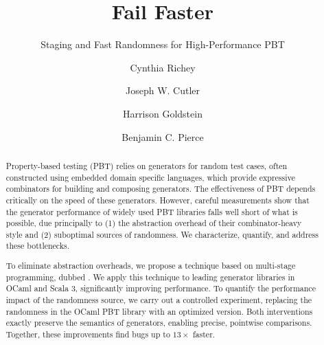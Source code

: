 \documentclass[acmsmall]{acmart}
\theoremstyle{definition}
\begin{document}
\title{Fail Faster}
\subtitle{Staging and Fast Randomness for High-Performance PBT}



\author{Cynthia Richey}

\author{Joseph W. Cutler}
\authornotemark[1]

\author{Harrison Goldstein}

\author{Benjamin C. Pierce}
\renewcommand{\shortauthors}{C. Richey, J. W. Cutler, H. Goldstein, and B. C. Pierce}

\begin{abstract}
Property-based testing (PBT) relies on generators for random test
cases, often constructed using embedded domain specific languages,
which provide expressive combinators for building and composing
generators.  The effectiveness of PBT depends critically on the speed
of these generators.
%
However, careful measurements show that the generator performance of
widely used PBT libraries falls well short of what is possible,
due principally to (1) the abstraction overhead of their
combinator-heavy style and (2) suboptimal sources of randomness.
We characterize, quantify, and address these bottlenecks.

To eliminate abstraction overheads, we propose a technique based on
multi-stage programming, dubbed \name.  We apply this technique to
leading generator libraries in OCaml and Scala 3, significantly
improving performance.
%
To quantify the performance impact of the randomness source, we carry
out a controlled experiment, replacing the randomness in the OCaml PBT
library with an optimized version.
%
Both interventions exactly preserve the semantics of generators,
enabling precise, pointwise comparisons.
%
Together, these improvements find bugs up to $13\times$ faster.
\end{abstract}
\end{document}
